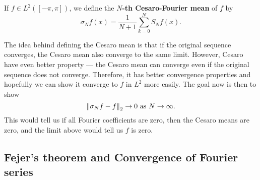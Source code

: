 \documentclass[a4paper]{article}
\begin{document}
\begin{defi}
If $f \in L^2([-\pi, \pi])$, we define the 
\textbf{$N$-th Cesaro-Fourier mean} of $f$ by 
\[
\sigma_N f(x) = \frac{1}{N+1} \sum_{k=0}^N 
S_N f(x).
\]
\end{defi}

The idea behind defining the Cesaro mean is that 
if the original sequence converges, the Cesaro mean 
also converge to the same limit. However, Cesaro 
have even better property --- the Cesaro mean 
can converge even if the original sequence does not 
converge. Therefore, it has better convergence properties
and hopefully we can show it converge to $f$ in $L^2$ more 
easily. The goal now is then to show 
\[
\left\lVert \sigma_N f - f\right\rVert_2 \to 0 \text{ as $N \to \infty$}.
\]
This would tell us if all Fourier coefficients are zero, 
then the Cesaro means are zero, and the limit above 
would tell us $f$ is zero.

\subsection{Fejer's theorem and Convergence 
of Fourier series}
\end{document}
